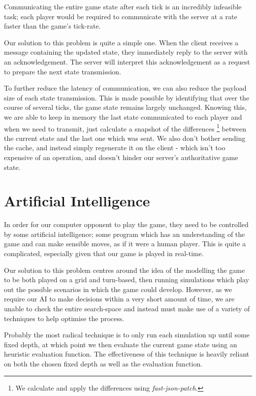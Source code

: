 \documentclass{standalone}
\begin{document}
		Communicating the entire game state after each tick is an incredibly infeasible task; each player would be required to communicate with the server at a rate faster than the game's tick-rate.

		Our solution to this problem is quite a simple one. When the client receives a message containing the updated state, they immediately reply to the server with an acknowledgement. The server will interpret this acknowledgement as a request to prepare the next state transmission.

		To further reduce the latency of communication, we can also reduce the payload size of each state transmission. This is made possible by identifying that over the course of several ticks, the game state remains largely unchanged. Knowing this, we are able to keep in memory the last state communicated to each player and when we need to transmit, just calculate a snapshot of the differences \footnote{We calculate and apply the differences using \emph{fast-json-patch}\parencite{FastJsonPatch}.} between the current state and the last one which was sent. We also don't bother sending the cache, and instead simply regenerate it on the client - which isn't too expensive of an operation, and doesn't hinder our server's authoritative game state.

	\section{Artificial Intelligence}
		In order for our computer opponent to play the game, they need to be controlled by some artificial intelligence; some program which has an understanding of the game and can make sensible moves, as if it were a human player. This is quite a complicated, especially given that our game is played in real-time.

		Our solution to this problem centres around the idea of the modelling the game to be both played on a grid and turn-based, then running simulations which play out the possible scenarios in which the game could develop. However, as we require our AI to make decisions within a very short amount of time, we are unable to check the entire search-space and instead must make use of a variety of techniques to help optimise the process.

		Probably the most radical technique is to only run each simulation up until some fixed depth, at which point we then evaluate the current game state using an heuristic evaluation function. The effectiveness of this technique is heavily reliant on both the chosen fixed depth as well as the evaluation function.
\end{document}
